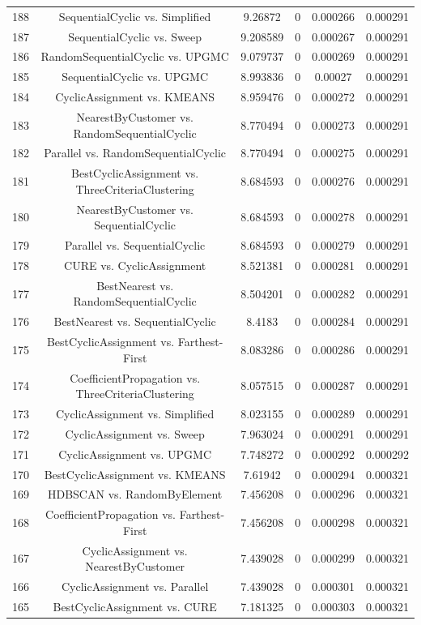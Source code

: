 \documentclass[a4paper,10pt]{article}
\begin{document}
\begin{landscape}
\begin{table}[!htp]
\begin{tabular}{cccccc}
188&SequentialCyclic vs. Simplified&9.26872&0&0.000266&0.000291\\
187&SequentialCyclic vs. Sweep&9.208589&0&0.000267&0.000291\\
186&RandomSequentialCyclic vs. UPGMC&9.079737&0&0.000269&0.000291\\
185&SequentialCyclic vs. UPGMC&8.993836&0&0.00027&0.000291\\
184&CyclicAssignment vs. KMEANS&8.959476&0&0.000272&0.000291\\
183&NearestByCustomer vs. RandomSequentialCyclic&8.770494&0&0.000273&0.000291\\
182&Parallel vs. RandomSequentialCyclic&8.770494&0&0.000275&0.000291\\
181&BestCyclicAssignment vs. ThreeCriteriaClustering&8.684593&0&0.000276&0.000291\\
180&NearestByCustomer vs. SequentialCyclic&8.684593&0&0.000278&0.000291\\
179&Parallel vs. SequentialCyclic&8.684593&0&0.000279&0.000291\\
178&CURE vs. CyclicAssignment&8.521381&0&0.000281&0.000291\\
177&BestNearest vs. RandomSequentialCyclic&8.504201&0&0.000282&0.000291\\
176&BestNearest vs. SequentialCyclic&8.4183&0&0.000284&0.000291\\
175&BestCyclicAssignment vs. Farthest-First&8.083286&0&0.000286&0.000291\\
174&CoefficientPropagation vs. ThreeCriteriaClustering&8.057515&0&0.000287&0.000291\\
173&CyclicAssignment vs. Simplified&8.023155&0&0.000289&0.000291\\
172&CyclicAssignment vs. Sweep&7.963024&0&0.000291&0.000291\\
171&CyclicAssignment vs. UPGMC&7.748272&0&0.000292&0.000292\\
170&BestCyclicAssignment vs. KMEANS&7.61942&0&0.000294&0.000321\\
169&HDBSCAN vs. RandomByElement&7.456208&0&0.000296&0.000321\\
168&CoefficientPropagation vs. Farthest-First&7.456208&0&0.000298&0.000321\\
167&CyclicAssignment vs. NearestByCustomer&7.439028&0&0.000299&0.000321\\
166&CyclicAssignment vs. Parallel&7.439028&0&0.000301&0.000321\\
165&BestCyclicAssignment vs. CURE&7.181325&0&0.000303&0.000321\\

\end{tabular}
\end{table}
\end{landscape}
\end{document}
